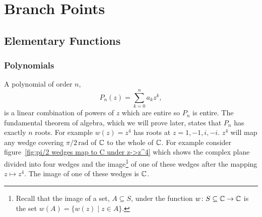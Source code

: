 \documentclass{article}
\newcommand{\st}{\mid}
\begin{document}
    \section{Branch Points}\label{sec:branch points}
    \subsection{Elementary Functions}
    \subsubsection{Polynomials}
    A polynomial of order \(n\),
    \[P_n(z) = \sum_{k = 0}^{n} a_kz^k,\]
    is a linear combination of powers of \(z\) which are entire so \(P_n\) is entire.
    The fundamental theorem of algebra, which we will prove later, states that \(P_n\) has exactly \(n\) roots.
    For example \(w(z) = z^4\) has roots at \(z = 1, -1, i, -i\).
    \(z^4\) will map any wedge covering \(\pi/2\, \si{\radian}\) of \(\mathbb{C}\) to the whole of \(\mathbb{C}\).
    For example consider figure~\ref{fig:pi/2 wedges map to C under z->z^4} which shows the complex plane divided into four wedges and the image\footnote{Recall that the image of a set, \(A\subseteq S\), under the function \(w\colon S\subseteq\mathbb{C}\to\mathbb{C}\) is the set \(w(A) = \{w(z)\st z\in A\}\).} of one of these wedges after the mapping \(z\mapsto z^4\).
    The image of one of these wedges is \(\mathbb{C}\).
\end{document}
